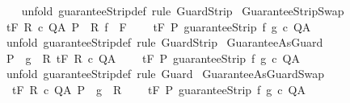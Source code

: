 \begin{isabellebody}
%
\isadelimproof
\ \ %
\endisadelimproof
%
\isatagproof
{}\isamarkupfalse%
\ {\isacharparenleft}unfold\ guaranteeStrip{\isacharunderscore}def{\isacharparenright}\ {\isacharparenleft}rule\ GuardStrip{\isacharparenright}%
\endisatagproof
{\isafoldproof}%
%
\isadelimproof
\isanewline
%
\endisadelimproof
\isanewline
{}\isamarkupfalse%
\ GuaranteeStripSwap{\isacharcolon}\isanewline
\ {\isachardoublequoteopen}{\isasymlbrakk}{\isasymGamma}{\isacharcomma}{\isasymTheta}{\isasymturnstile}\isactrlsub t\isactrlbsub {\isacharslash}F\isactrlesub \ R\ c\ Q{\isacharcomma}A{\isacharsemicolon}\ P\ {\isasymsubseteq}\ R{\isacharsemicolon}\ f\ {\isasymin}\ F{\isasymrbrakk}\ \isanewline
\ \ {\isasymLongrightarrow}\ {\isasymGamma}{\isacharcomma}{\isasymTheta}{\isasymturnstile}\isactrlsub t\isactrlbsub {\isacharslash}F\isactrlesub \ P\ {\isacharparenleft}guaranteeStrip\ f\ g\ c{\isacharparenright}\ Q{\isacharcomma}A{\isachardoublequoteclose}\isanewline
%
\isadelimproof
\ \ %
\endisadelimproof
%
\isatagproof
{}\isamarkupfalse%
\ {\isacharparenleft}unfold\ guaranteeStrip{\isacharunderscore}def{\isacharparenright}\ {\isacharparenleft}rule\ GuardStrip{\isacharparenright}%
\endisatagproof
{\isafoldproof}%
%
\isadelimproof
\isanewline
%
\endisadelimproof
\isanewline
{}\isamarkupfalse%
\ GuaranteeAsGuard{\isacharcolon}\isanewline
\ {\isachardoublequoteopen}{\isasymlbrakk}P\ {\isasymsubseteq}\ g\ {\isasyminter}\ R{\isacharsemicolon}\ {\isasymGamma}{\isacharcomma}{\isasymTheta}{\isasymturnstile}\isactrlsub t\isactrlbsub {\isacharslash}F\isactrlesub \ R\ c\ Q{\isacharcomma}A{\isasymrbrakk}\ \isanewline
\ \ {\isasymLongrightarrow}\ {\isasymGamma}{\isacharcomma}{\isasymTheta}{\isasymturnstile}\isactrlsub t\isactrlbsub {\isacharslash}F\isactrlesub \ P\ guaranteeStrip\ f\ g\ c\ Q{\isacharcomma}A{\isachardoublequoteclose}\isanewline
%
\isadelimproof
\ \ %
\endisadelimproof
%
\isatagproof
{}\isamarkupfalse%
\ {\isacharparenleft}unfold\ guaranteeStrip{\isacharunderscore}def{\isacharparenright}\ {\isacharparenleft}rule\ Guard{\isacharparenright}%
\endisatagproof
{\isafoldproof}%
%
\isadelimproof
\isanewline
%
\endisadelimproof
\isanewline
{}\isamarkupfalse%
\ GuaranteeAsGuardSwap{\isacharcolon}\isanewline
\ {\isachardoublequoteopen}{\isasymlbrakk}\ {\isasymGamma}{\isacharcomma}{\isasymTheta}{\isasymturnstile}\isactrlsub t\isactrlbsub {\isacharslash}F\isactrlesub \ R\ c\ Q{\isacharcomma}A{\isacharsemicolon}\ P\ {\isasymsubseteq}\ g\ {\isasyminter}\ R{\isasymrbrakk}\ \isanewline
\ \ {\isasymLongrightarrow}\ {\isasymGamma}{\isacharcomma}{\isasymTheta}{\isasymturnstile}\isactrlsub t\isactrlbsub {\isacharslash}F\isactrlesub \ P\ guaranteeStrip\ f\ g\ c\ Q{\isacharcomma}A{\isachardoublequoteclose}\isanewline

\end{isabellebody}
